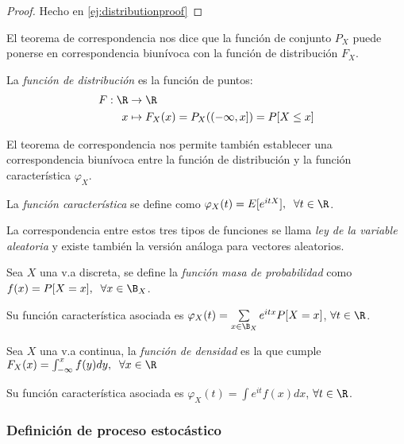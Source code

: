 \begin{proof}
  Hecho en \ref{ej:distributionproof}
\end{proof}

El teorema de correspondencia nos dice que la función de conjunto $P_X$ puede ponerse en correspondencia biunívoca con la función de distribución $F_X$.

\begin{ndef}
  La \emph{función de distribución} es la función de puntos:
  \begin{align*}
    F: \R & \to \R \\
    x & \mapsto  F_X(x) = P_X((-\infty, x]) = P[X \leq x]
  \end{align*}
\end{ndef}

El teorema de correspondencia nos permite también establecer una correspondencia biunívoca entre la función de distribución y la función característica $\varphi_X$.

\begin{ndef}
  La \emph{función característica} se define como $\varphi_X(t) = E[e^{itX}], \; \; \forall t \in \R$.
\end{ndef}

La correspondencia entre estos tres tipos de funciones se llama \emph{ley de la variable aleatoria} y existe también la versión análoga para vectores aleatorios.

\begin{ndef}
  Sea $X$ una v.a discreta, se define la \emph{función masa de probabilidad} como $f(x) = P[X = x], \; \; \forall x \in \B_X$.
\end{ndef}

Su función característica asociada es $\varphi_X(t) = \sum \limits_{x \in \B_X} e^{itx} P[X = x]$, $\forall t \in \R$.

\begin{ndef}
  Sea $X$ una v.a continua, la \emph{función de densidad} es la que cumple $F_X(x) = \int^x_{-\infty} f(y) dy, \; \; \forall x \in \R $
\end{ndef}

Su función característica asociada es $\varphi_X(t) = \int e^{it} f(x) dx$, $\forall t \in \R$.

\subsubsection{Definición de proceso estocástico}


